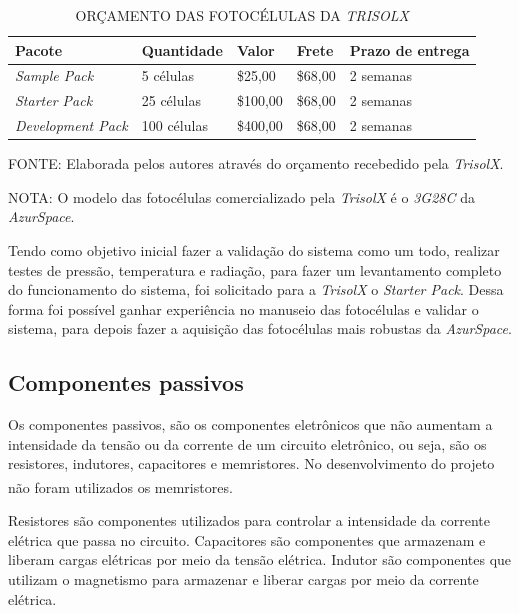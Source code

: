 \documentclass[
	12pt,				%
	openright,			%
	oneside,			%
	a4paper,			%
	english,			%
	french,				%
	spanish,			%
	brazil,				%
	oldfontcommands
	]{abntex2}
\begin{document}
	\begin{table}[th]
	\caption{ORÇAMENTO DAS FOTOCÉLULAS DA \textit{TRISOLX}}
	\label{Tab_Orc_TrisolX}
	\centering
	\begin{tabular}{p{3.5cm}|p{2.5cm}|p{1.5cm}|p{1.5cm}|p{2.0cm}}
		\textbf{Pacote} & \textbf{Quantidade} & \textbf{Valor} & \textbf{Frete} & \textbf{Prazo de entrega}\\
		\hline
		\textit{Sample Pack} & 5 células & \$25,00 &  \$68,00 & 2 semanas\\
		\textit{Starter Pack} & 25 células & \$100,00 &  \$68,00 & 2 semanas\\
		\textit{Development Pack} & 100 células & \$400,00 & \$68,00 & 2 semanas\\
	\end{tabular}
	
	\begin{small}
	\vspace{3pt}
		FONTE: Elaborada pelos autores através do orçamento recebedido pela \textit{TrisolX}.
	\end{small}
	
	\begin{footnotesize}
		NOTA: O modelo das fotocélulas comercializado pela \textit{TrisolX} é o \textit{3G28C} da \textit{AzurSpace}.
	\end{footnotesize}
	\end{table}	
	
	Tendo como objetivo inicial fazer a validação do sistema como um todo, realizar testes de pressão, temperatura e radiação, para fazer um levantamento completo do funcionamento do sistema, foi solicitado para a \textit{TrisolX} o \textit{Starter Pack}. Dessa forma foi possível ganhar experiência no manuseio das fotocélulas e validar o sistema, para depois fazer a aquisição das fotocélulas mais robustas da \textit{AzurSpace}.
	
\subsection[Componentes passivos]{Componentes passivos}

	Os componentes passivos, são os componentes eletrônicos que não aumentam a intensidade da tensão ou da corrente de um circuito eletrônico, ou seja, são os resistores, indutores, capacitores e memristores. No desenvolvimento do projeto não foram utilizados os memristores.\textsuperscript{\cite{Passivo}}
	
	Resistores são componentes utilizados para controlar a intensidade da corrente elétrica que passa no circuito. Capacitores são componentes que armazenam e liberam cargas elétricas por meio da tensão elétrica. Indutor são componentes que utilizam o magnetismo para armazenar e liberar cargas por meio da corrente elétrica.
\end{document}
